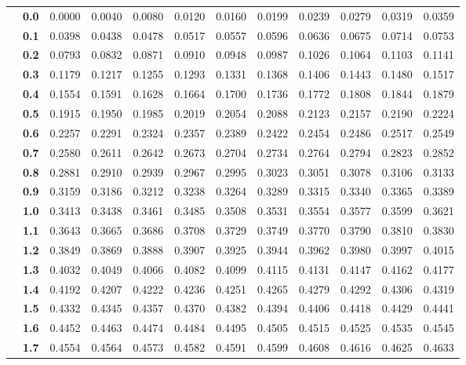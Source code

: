 \begin{tabular}{cc|cccccccccc}
    & \textbf{0.0} & 0.0000 & 0.0040 & 0.0080 & 0.0120 & 0.0160 & 0.0199 & 0.0239 & 0.0279 & 0.0319 & 0.0359 \\
    & \textbf{0.1} & 0.0398 & 0.0438 & 0.0478 & 0.0517 & 0.0557 & 0.0596 & 0.0636 & 0.0675 & 0.0714 & 0.0753 \\
    & \textbf{0.2} & 0.0793 & 0.0832 & 0.0871 & 0.0910 & 0.0948 & 0.0987 & 0.1026 & 0.1064 & 0.1103 & 0.1141 \\
    & \textbf{0.3} & 0.1179 & 0.1217 & 0.1255 & 0.1293 & 0.1331 & 0.1368 & 0.1406 & 0.1443 & 0.1480 & 0.1517 \\
    & \textbf{0.4} & 0.1554 & 0.1591 & 0.1628 & 0.1664 & 0.1700 & 0.1736 & 0.1772 & 0.1808 & 0.1844 & 0.1879 \\
    & \textbf{0.5} & 0.1915 & 0.1950 & 0.1985 & 0.2019 & 0.2054 & 0.2088 & 0.2123 & 0.2157 & 0.2190 & 0.2224 \\
    & \textbf{0.6} & 0.2257 & 0.2291 & 0.2324 & 0.2357 & 0.2389 & 0.2422 & 0.2454 & 0.2486 & 0.2517 & 0.2549 \\
    & \textbf{0.7} & 0.2580 & 0.2611 & 0.2642 & 0.2673 & 0.2704 & 0.2734 & 0.2764 & 0.2794 & 0.2823 & 0.2852 \\
    & \textbf{0.8} & 0.2881 & 0.2910 & 0.2939 & 0.2967 & 0.2995 & 0.3023 & 0.3051 & 0.3078 & 0.3106 & 0.3133 \\
    & \textbf{0.9} & 0.3159 & 0.3186 & 0.3212 & 0.3238 & 0.3264 & 0.3289 & 0.3315 & 0.3340 & 0.3365 & 0.3389 \\
    & \textbf{1.0} & 0.3413 & 0.3438 & 0.3461 & 0.3485 & 0.3508 & 0.3531 & 0.3554 & 0.3577 & 0.3599 & 0.3621 \\
    & \textbf{1.1} & 0.3643 & 0.3665 & 0.3686 & 0.3708 & 0.3729 & 0.3749 & 0.3770 & 0.3790 & 0.3810 & 0.3830 \\
    & \textbf{1.2} & 0.3849 & 0.3869 & 0.3888 & 0.3907 & 0.3925 & 0.3944 & 0.3962 & 0.3980 & 0.3997 & 0.4015 \\
    & \textbf{1.3} & 0.4032 & 0.4049 & 0.4066 & 0.4082 & 0.4099 & 0.4115 & 0.4131 & 0.4147 & 0.4162 & 0.4177 \\
    & \textbf{1.4} & 0.4192 & 0.4207 & 0.4222 & 0.4236 & 0.4251 & 0.4265 & 0.4279 & 0.4292 & 0.4306 & 0.4319 \\
    & \textbf{1.5} & 0.4332 & 0.4345 & 0.4357 & 0.4370 & 0.4382 & 0.4394 & 0.4406 & 0.4418 & 0.4429 & 0.4441 \\
    & \textbf{1.6} & 0.4452 & 0.4463 & 0.4474 & 0.4484 & 0.4495 & 0.4505 & 0.4515 & 0.4525 & 0.4535 & 0.4545 \\
    & \textbf{1.7} & 0.4554 & 0.4564 & 0.4573 & 0.4582 & 0.4591 & 0.4599 & 0.4608 & 0.4616 & 0.4625 & 0.4633 \\

\end{tabular}
